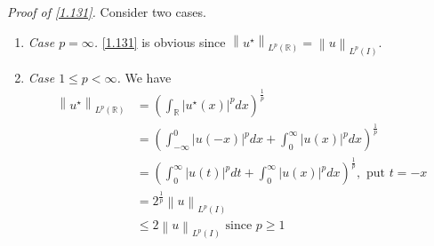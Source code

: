 \documentclass[a4paper,oneside]{article}
\numberwithin{equation}{section}
\begin{document}
\textit{Proof of \eqref{1.131}.} Consider two cases.
\begin{enumerate}
\item \textit{Case $p=\infty$.} \eqref{1.131} is obvious since ${\left\| {u^{\star}} \right\|_{{L^p}\left( \mathbb{R} \right)}} = {\left\| u \right\|_{{L^p}\left( I \right)}}$.
\item \textit{Case $1\le p <\infty$.} We have
\begin{align}
{\left\| {u^{\star}} \right\|_{{L^p}\left( \mathbb{R} \right)}} &= {\left( {\int_{\mathbb{R}} {{{\left| {u^{\star}\left( x \right)} \right|}^p}dx} } \right)^{\frac{1}{p}}}\\
 &= {\left( {\int_{ - \infty }^0 {{{\left| {u\left( { - x} \right)} \right|}^p}dx}  + \int_0^\infty  {{{\left| {u\left( x \right)} \right|}^p}dx} } \right)^{\frac{1}{p}}}\\
& = {\left( {\int_0^\infty  {{{\left| {u\left( t \right)} \right|}^p}dt}  + \int_0^\infty  {{{\left| {u\left( x \right)} \right|}^p}dx} } \right)^{\frac{1}{p}}},\mbox{ put } t =  - x\\
 &= {2^{\frac{1}{p}}}{\left\| u \right\|_{{L^p}\left( I \right)}}\label{1.135}\\
& \le 2{\left\| u \right\|_{{L^p}\left( I \right)}}\mbox{ since }p \ge 1
\end{align}
\end{enumerate}
\end{document}
